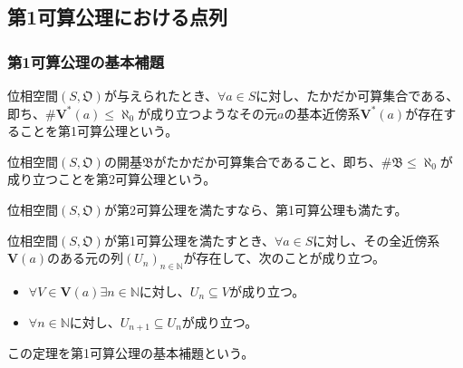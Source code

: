 \documentclass[dvipdfmx]{jsarticle}
\begin{document}
\subsection{第1可算公理における点列}%
\subsubsection{第1可算公理の基本補題}%
\begin{dfn*}
位相空間$\left( S,\mathfrak{O} \right)$が与えられたとき、$\forall a \in S$に対し、たかだか可算集合である、即ち、${\#}{\mathbf{V}^{*}(a)} \leq \aleph_{0}$が成り立つようなその元$a$の基本近傍系$\mathbf{V}^{*}(a)$が存在することを第1可算公理という。
\end{dfn*}
\begin{dfn*}
位相空間$\left( S,\mathfrak{O} \right)$の開基$\mathfrak{B}$がたかだか可算集合であること、即ち、${\#}\mathfrak{B} \leq \aleph_{0}$が成り立つことを第2可算公理という。
\end{dfn*}
\begin{thm*}
位相空間$\left( S,\mathfrak{O} \right)$が第2可算公理を満たすなら、第1可算公理も満たす。
\end{thm*}
\begin{thm*}
位相空間$\left( S,\mathfrak{O} \right)$が第1可算公理を満たすとき、$\forall a \in S$に対し、その全近傍系$\mathbf{V}(a)$のある元の列$\left( U_{n} \right)_{n \in \mathbb{N}}$が存在して、次のことが成り立つ。
\begin{itemize}
\item
  $\forall V \in \mathbf{V}(a)\exists n \in \mathbb{N}$に対し、$U_{n} \subseteq V$が成り立つ。
\item
  $\forall n \in \mathbb{N}$に対し、$U_{n + 1} \subseteq U_{n}$が成り立つ。
\end{itemize}
この定理を第1可算公理の基本補題という。
\end{thm*}
\end{document}
